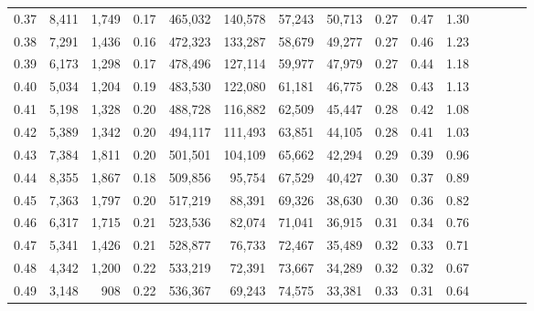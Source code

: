\begin{tabular}{rrrcrrrrrrrrrrr}
0.37 &   8,411 &  1,749 &                                       0.17 &  465,032 &  140,578 &   57,243 &   50,713 &  0.27 &  0.47 &                         1.30 \\
0.38 &   7,291 &  1,436 &                                       0.16 &  472,323 &  133,287 &   58,679 &   49,277 &  0.27 &  0.46 &                         1.23 \\
0.39 &   6,173 &  1,298 &                                       0.17 &  478,496 &  127,114 &   59,977 &   47,979 &  0.27 &  0.44 &                         1.18 \\
0.40 &   5,034 &  1,204 &                                       0.19 &  483,530 &  122,080 &   61,181 &   46,775 &  0.28 &  0.43 &                         1.13 \\
0.41 &   5,198 &  1,328 &                                       0.20 &  488,728 &  116,882 &   62,509 &   45,447 &  0.28 &  0.42 &                         1.08 \\
0.42 &   5,389 &  1,342 &                                       0.20 &  494,117 &  111,493 &   63,851 &   44,105 &  0.28 &  0.41 &                         1.03 \\
0.43 &   7,384 &  1,811 &                                       0.20 &  501,501 &  104,109 &   65,662 &   42,294 &  0.29 &  0.39 &                         0.96 \\
0.44 &   8,355 &  1,867 &                                       0.18 &  509,856 &   95,754 &   67,529 &   40,427 &  0.30 &  0.37 &                         0.89 \\
0.45 &   7,363 &  1,797 &                                       0.20 &  517,219 &   88,391 &   69,326 &   38,630 &  0.30 &  0.36 &                         0.82 \\
0.46 &   6,317 &  1,715 &                                       0.21 &  523,536 &   82,074 &   71,041 &   36,915 &  0.31 &  0.34 &                         0.76 \\
0.47 &   5,341 &  1,426 &                                       0.21 &  528,877 &   76,733 &   72,467 &   35,489 &  0.32 &  0.33 &                         0.71 \\
0.48 &   4,342 &  1,200 &                                       0.22 &  533,219 &   72,391 &   73,667 &   34,289 &  0.32 &  0.32 &                         0.67 \\
0.49 &   3,148 &    908 &                                       0.22 &  536,367 &   69,243 &   74,575 &   33,381 &  0.33 &  0.31 &                         0.64 \\

\end{tabular}
